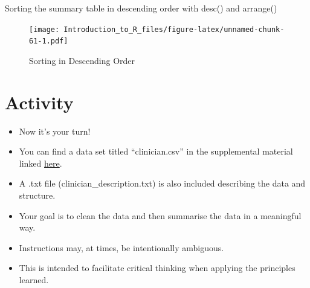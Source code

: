 \documentclass[]{book}
\newenvironment{Shaded}{\begin{snugshade}}{\end{snugshade}}
\newcommand{\DataTypeTok}[1]{\textcolor[rgb]{0.13,0.29,0.53}{#1}}
\newcommand{\KeywordTok}[1]{\textcolor[rgb]{0.13,0.29,0.53}{\textbf{#1}}}
\newcommand{\NormalTok}[1]{#1}
\newcommand{\OperatorTok}[1]{\textcolor[rgb]{0.81,0.36,0.00}{\textbf{#1}}}
\newcommand{\OtherTok}[1]{\textcolor[rgb]{0.56,0.35,0.01}{#1}}
\newcommand{\StringTok}[1]{\textcolor[rgb]{0.31,0.60,0.02}{#1}}
\providecommand{\tightlist}{%
  \setlength{\itemsep}{0pt}\setlength{\parskip}{0pt}}
\theoremstyle{definition}
\theoremstyle{definition}
\theoremstyle{definition}
\theoremstyle{remark}
\let\BeginKnitrBlock\begin \let\EndKnitrBlock\end
\begin{document}
\BeginKnitrBlock{example}
\protect\hypertarget{exm:arr2}{}{\label{exm:arr2} }Sorting the summary table in descending order with desc() and arrange()
\EndKnitrBlock{example}

\begin{Shaded}
\end{Shaded}

\begin{figure}
\centering
\texttt{[image: Introduction\_to\_R\_files/figure-latex/unnamed-chunk-61-1.pdf]}
\caption{\label{fig:unnamed-chunk-61}Sorting in Descending Order}
\end{figure}

\hypertarget{activity}{%
\chapter{Activity}\label{activity}}

\begin{itemize}
\tightlist
\item
  Now it's your turn!
\item
  You can find a data set titled ``clinician.csv'' in the supplemental material linked \href{https://github.com/jimmyrigby94/Data-Management-in-R/tree/master/suppl}{here}.
\item
  A .txt file (clinician\_description.txt) is also included describing the data and structure.
\item
  Your goal is to clean the data and then summarise the data in a meaningful way.
\item
  Instructions may, at times, be intentionally ambiguous.
\item
  This is intended to facilitate critical thinking when applying the principles learned.
\end{itemize}
\end{document}
